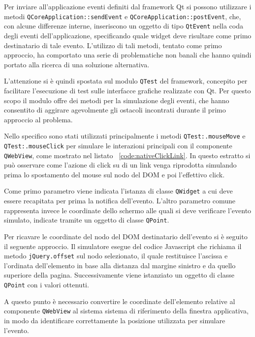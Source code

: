 \documentclass[12pt]{toptesi}
\begin{document}
Per inviare all'applicazione eventi definiti dal framework Qt si possono utilizzare i metodi \verb|QCoreApplication::sendEvent| e \verb|QCoreApplication::postEvent|, che, con alcune differenze interne, inseriscono un oggetto di tipo \verb|QtEvent| nella coda degli eventi dell'applicazione, specificando quale widget deve risultare come primo destinatario di tale evento. L'utilizzo di tali metodi, tentato come primo approccio, ha comportato una serie di problematiche non banali che hanno quindi portato alla ricerca di una soluzione alternativa.

L'attenzione si è quindi spostata sul modulo \verb|QTest| del framework, concepito per facilitare l'esecuzione di test sulle interfacce grafiche realizzate con Qt. Per questo scopo il modulo offre dei metodi per la simulazione degli eventi, che hanno consentito di aggirare agevolmente gli ostacoli incontrati durante il primo approccio al problema.

Nello specifico sono stati utilizzati principalmente i metodi \verb|QTest:.mouseMove| e \verb|QTest:.mouseClick| per simulare le interazioni principali con il componente \verb|QWebView|, come mostrato nel listato ~\ref{code:nativeClickLink}. In questo estratto si può osservare come l'azione di click su di un link venga riprodotta simulando prima lo spostamento del mouse sul nodo del DOM e poi l'effettivo click.



Come primo parametro viene indicata l'istanza di classe \verb|QWidget| a cui deve essere recapitata per prima la notifica dell'evento. L'altro parametro comune rappresenta invece le coordinate dello schermo alle quali si deve verificare l'evento simulato, indicate tramite un oggetto di classe \verb|QPoint|.

Per ricavare le coordinate del nodo del DOM destinatario dell'evento si è seguito il seguente approccio. Il simulatore esegue del codice Javascript che richiama il metodo \verb|jQuery.offset| sul nodo selezionato, il quale restituisce l'ascissa e l'ordinata dell'elemento in base alla distanza dal margine sinistro e da quello superiore della pagina. Successivamente viene istanziato un oggetto di classe \verb|QPoint| con i valori ottenuti. 

A questo punto è necessario convertire le coordinate dell'elemento relative al componente \verb|QWebView| al sistema sistema di riferimento della finestra applicativa, in modo da identificare correttamente la posizione utilizzata per simulare l'evento. 
\end{document}
